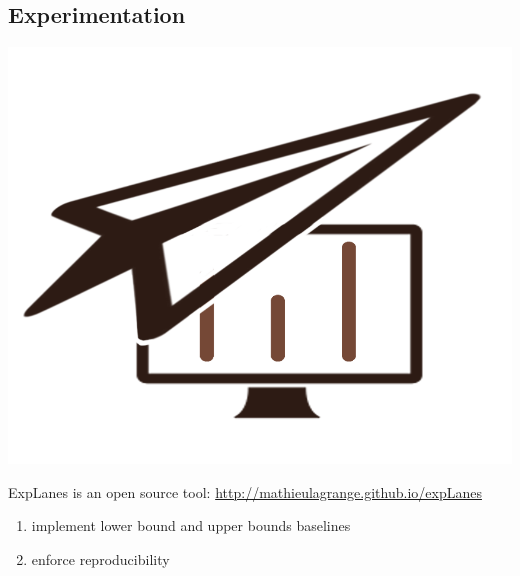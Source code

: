 \documentclass[a4paper,fleqn]{tufte-handout}
\begin{document}
\subsection{Experimentation}

\begin{marginfigure}
\begin{center}
\includegraphics[width=\textwidth]{figures/logo} 
\end{center}
\caption{\label{fig:explanes} ExpLanes is an open source tool: \url{http://mathieulagrange.github.io/expLanes}}
\end{marginfigure}

\begin{enumerate}
\item implement lower bound and upper bounds baselines
\item enforce reproducibility
\end{enumerate}




  
 
 
  
\end{document}
